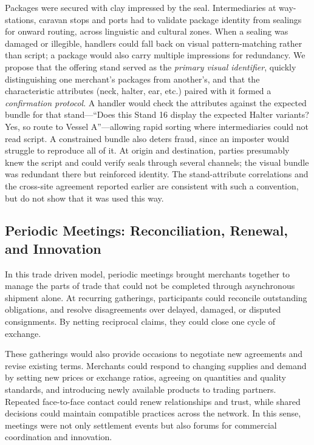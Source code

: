 \documentclass[12pt]{article}
\begin{document}
Packages were secured with clay impressed by the seal. Intermediaries at
way-stations, caravan stops and ports had to validate package identity from
sealings for onward routing, across linguistic and cultural zones. When a sealing
was damaged or illegible, handlers could fall back on visual pattern-matching
rather than script; a package would also carry multiple impressions for
redundancy. We propose that the offering stand served as the \textit{primary
visual identifier}, quickly distinguishing one merchant's packages from another's,
and that the characteristic attributes (neck, halter, ear, etc.) paired with it
formed a \textit{confirmation protocol}. A handler would check the attributes
against the expected bundle for that stand---``Does this Stand 16 display the
expected Halter variants? Yes, so route to Vessel A''---allowing rapid sorting
where intermediaries could not read script. A constrained bundle also deters
fraud, since an imposter would struggle to reproduce all of it. At origin and
destination, parties presumably knew the script and could verify seals through
several channels; the visual bundle was redundant there but reinforced identity.
The stand-attribute correlations and the cross-site agreement reported earlier are
consistent with such a convention, but do not show that it was used this way.

\subsection{Periodic Meetings: Reconciliation, Renewal, and Innovation}

In this trade driven model, periodic meetings brought merchants together to manage
the parts of trade that could not be completed through asynchronous shipment alone.
At recurring gatherings, participants could reconcile outstanding obligations, and
resolve disagreements over delayed, damaged, or disputed consignments. By netting
reciprocal claims, they could close one cycle of exchange.

These gatherings would also provide occasions to negotiate new agreements and revise
existing terms. Merchants could respond to changing supplies and demand by setting
new prices or exchange ratios, agreeing on quantities and quality standards, and
introducing newly available products to trading partners. Repeated face-to-face
contact could renew relationships and trust, while shared decisions could maintain
compatible practices across the network. In this sense, meetings were not only
settlement events but also forums for commercial coordination and innovation.
\end{document}
